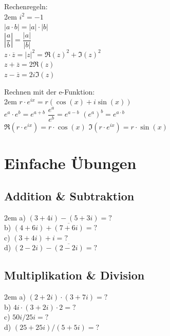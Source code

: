 \documentclass[11pt,final]{scrreprt}
\begin{document}
Rechenregeln:\\

\begingroup
\leftskip2em 
$ i^2 = -1 $\\
$ |a \cdot b| = |a| \cdot |b| $\\
$\left| \dfrac{a}{b} \right| = \dfrac{|a|}{|b|} $\\
$ z\cdot\overline{z}=|z|^2 = \Re(z)^2+\Im(z)^2$\\
$ z+\overline{z}=2\Re(z) $\\
$ z-\overline{z}=2i\Im(z) $\\
\par	
\endgroup 

Rechnen mit der e-Funktion:\\

\begingroup
\leftskip2em 
$ r\cdot e^{ix} = r(\cos(x) + i\sin(x)) $\\
$ e^a \cdot e^b = e^{a+b} $\hspace{2em}
$ \dfrac{e^a}{e^b} = e^{a-b} $\hspace{2em}
$ (e^a)^b = e^{a \cdot b} $\\
$ \Re(r\cdot e^{ix}) = r \cdot \cos(x) $\hspace{2em}
$ \Im(r\cdot e^{ix}) = r \cdot \sin(x) $ \\
\par	
\endgroup 

\section{Einfache Übungen}
\subsection{Addition \& Subtraktion}
\begingroup
\leftskip2em 
a) $(3+4i) - (5+3i)= ?$\\
b) $(4+6i) + \overline{(7+6i)}= ?$\\
c) $(3+4i) + i= ?$\\
d) $(2-2i) - \overline{(2-2i)}= ?$
\par	
\endgroup 
\subsection{Multiplikation \& Division}
\begingroup
\leftskip2em 
a) $(2+2i)\cdot(3+7i)= ?$\\
b) $4i\cdot (3+2i) \cdot 2= ?$\\
c) $50i / 25i= ?$\\
d) $(25+25i) / (5+5i)= ?$
\par	
\endgroup 
\end{document}
